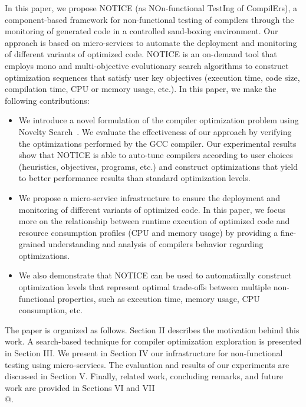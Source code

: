 In this paper, we propose NOTICE (as NOn-functional TestIng of CompilErs), a component-based framework for non-functional testing of compilers through the monitoring of generated code in a controlled sand-boxing environment. Our approach is based on micro-services to automate the deployment and monitoring of different variants of optimized code. NOTICE is an on-demand tool that employs mono and multi-objective evolutionary search algorithms to construct optimization sequences that satisfy user key objectives (execution time, code size, compilation time, CPU or memory usage, etc.).
In this paper, we make the following contributions:
\begin{itemize} 
	
	\item We introduce a novel formulation of the compiler optimization problem using Novelty Search~\cite{lehman2008exploiting}. We evaluate the effectiveness of our approach by verifying the optimizations performed by the GCC compiler.
	Our experimental results show that NOTICE is able to auto-tune compilers according to user choices (heuristics, objectives, programs, etc.) and construct optimizations that yield to better performance results than standard optimization levels.
	
	\item We propose a micro-service infrastructure to ensure the deployment and monitoring of different variants of optimized code. In this paper, we focus more on the relationship between runtime execution of optimized code and resource consumption profiles (CPU and memory usage) by providing a fine-grained understanding and analysis of compilers behavior regarding optimizations.

	\item We also demonstrate that NOTICE can be used to automatically construct optimization levels that represent optimal trade-offs between multiple non-functional properties, such as execution time, memory usage, CPU consumption, etc.
\end{itemize}


 



The paper is organized as follows. Section II describes the motivation behind this work. A search-based technique for compiler optimization exploration is presented in Section III. We present in Section IV our infrastructure for non-functional testing using micro-services. The evaluation and results of our experiments are discussed in Section V. Finally, related work, concluding remarks, and future work are provided in Sections VI and VII\\@.


